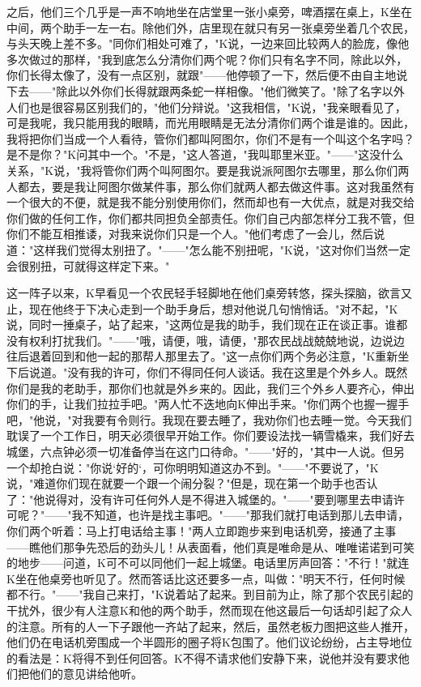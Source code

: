 \documentclass[12pt,a4paper]{article}
\begin{document}
之后，他们三个几乎是一声不响地坐在店堂里一张小桌旁，啤酒摆在桌上，K坐在中间，两个助手一左一右。除他们外，店里现在就只有另一张桌旁坐着几个农民，与头天晚上差不多。"同你们相处可难了，"K说，一边来回比较两人的脸庞，像他多次做过的那样，"我到底怎么分清你们两个呢？你们只有名字不同，除此以外，你们长得太像了，没有一点区别，就跟"——他停顿了一下，然后便不由自主地说下去——"除此以外你们长得就跟两条蛇一样相像。"他们微笑了。"除了名字以外人们也是很容易区别我们的，"他们分辩说。"这我相信，"K说，"我亲眼看见了，可是我呢，我只能用我的眼睛，而光用眼睛是无法分清你们两个谁是谁的。因此，我将把你们当成一个人看待，管你们都叫阿图尔，你们不是有一个叫这个名字吗？是不是你？"K问其中一个。"不是，"这人答道，"我叫耶里米亚。"——"这没什么关系，"K说，"我将管你们两个叫阿图尔。要是我说派阿图尔去哪里，那么你们两人都去，要是我让阿图尔做某件事，那么你们就两人都去做这件事。这对我虽然有一个很大的不便，就是我不能分别使用你们，然而却也有一大优点，就是对我交给你们做的任何工作，你们都共同担负全部责任。你们自己内部怎样分工我不管，但你们不能互相推诿，对我来说你们只是一个人。"他们考虑了一会儿，然后说道："这样我们觉得太别扭了。"——"怎么能不别扭呢，"K说，"这对你们当然一定会很别扭，可就得这样定下来。"

这一阵子以来，K早看见一个农民轻手轻脚地在他们桌旁转悠，探头探脑，欲言又止，现在他终于下决心走到一个助手身后，想对他说几句悄悄话。"对不起，"K说，同时一捶桌子，站了起来，"这两位是我的助手，我们现在正在谈正事。谁都没有权利打扰我们。"——"哦，请便，哦，请便，"那农民战战兢兢地说，边说边往后退着回到和他一起的那帮人那里去了。"这一点你们两个务必注意，"K重新坐下后说道。"没有我的许可，你们不得同任何人谈话。我在这里是个外乡人。既然你们是我的老助手，那你们也就是外乡来的。因此，我们三个外乡人要齐心，伸出你们的手，让我们拉拉手吧。"两人忙不迭地向K伸出手来。"你们两个也握一握手吧，"他说，"对我要有令则行。我现在要去睡了，我劝你们也去睡一觉。今天我们耽误了一个工作日，明天必须很早开始工作。你们要设法找一辆雪橇来，我们好去城堡，六点钟必须一切准备停当在这门口待命。"——"好的，"其中一人说。但另一个却抢白说："你说‘好的‘，可你明明知道这办不到。"——"不要说了，"K说，"难道你们现在就要一个跟一个闹分裂？"但是，现在第一个助手也否认了："他说得对，没有许可任何外人是不得进入城堡的。"——"要到哪里去申请许可呢？"——"我不知道，也许是找主事吧。"——"那我们就打电话到那儿去申请，你们两个听着：马上打电话给主事！"两人立即跑步来到电话机旁，接通了主事——瞧他们那争先恐后的劲头儿！从表面看，他们真是唯命是从、唯唯诺诺到可笑的地步——问道，K可不可以同他们一起上城堡。电话里厉声回答："不行！"就连K坐在他桌旁也听见了。然而答话比这还要多一点，叫做："明天不行，任何时候都不行。"——"我自己来打，"K说着站了起来。到目前为止，除了那个农民引起的干扰外，很少有人注意K和他的两个助手，然而现在他这最后一句话却引起了众人的注意。所有的人一下子跟他一齐站了起来，然后，虽然老板力图把这些人推开，他们仍在电话机旁围成一个半圆形的圈子将K包围了。他们议论纷纷，占主导地位的看法是：K将得不到任何回答。K不得不请求他们安静下来，说他并没有要求他们把他们的意见讲给他听。
\end{document}
